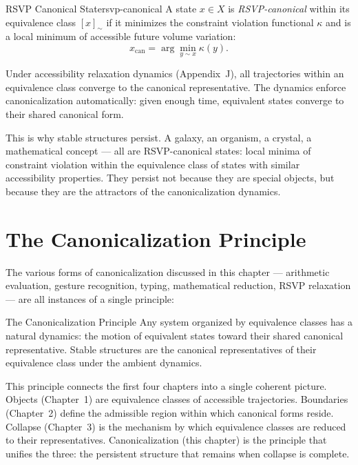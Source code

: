 \begin{definition}{RSVP Canonical State}{rsvp-canonical}
  A state $x \in X$ is \emph{RSVP-canonical} within its equivalence
  class $[x]_\sim$ if it minimizes the constraint violation functional
  $\kappa$ and is a local minimum of accessible future volume
  variation:
  \[
    x_\text{can} = \arg\min_{y \sim x} \kappa(y).
  \]
\end{definition}

Under accessibility relaxation dynamics (Appendix~J), all trajectories
within an equivalence class converge to the canonical representative.
The dynamics enforce canonicalization automatically: given enough time,
equivalent states converge to their shared canonical form.

\begin{remark}
  This is why stable structures persist. A galaxy, an organism, a crystal,
  a mathematical concept — all are RSVP-canonical states: local minima
  of constraint violation within the equivalence class of states with
  similar accessibility properties. They persist not because they are
  special objects, but because they are the attractors of the
  canonicalization dynamics.
\end{remark}

\section{The Canonicalization Principle}

The various forms of canonicalization discussed in this chapter — arithmetic
evaluation, gesture recognition, typing, mathematical reduction, RSVP
relaxation — are all instances of a single principle:

\begin{namedthm}{The Canonicalization Principle}
  Any system organized by equivalence classes has a natural dynamics:
  the motion of equivalent states toward their shared canonical
  representative. Stable structures are the canonical representatives
  of their equivalence class under the ambient dynamics.
\end{namedthm}

This principle connects the first four chapters into a single coherent
picture. Objects (Chapter~1) are equivalence classes of accessible
trajectories. Boundaries (Chapter~2) define the admissible region within
which canonical forms reside. Collapse (Chapter~3) is the mechanism by
which equivalence classes are reduced to their representatives.
Canonicalization (this chapter) is the principle that unifies the three:
the persistent structure that remains when collapse is complete.

